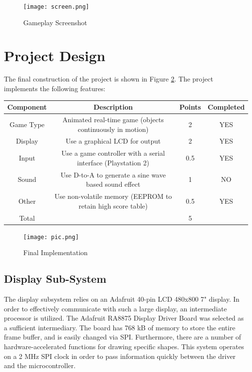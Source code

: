 \documentclass[a4paper, 12pt]{article}
\begin{document}
\begin{figure}[h!]
  \centering
  \texttt{[image: screen.png]}
  \caption{Gameplay Screenshot}
  \label{fig:screen}
\end{figure}

\section*{Project Design}
The final construction of the project is shown in Figure \ref{fig:pic}. The project implements the following features:

\begin{center}
  {\footnotesize
  \begin{tabular}{ |c|c|c|c| }
    \hline
    \textbf{Component} & \textbf{Description} & \textbf{Points} & \textbf{Completed} \\
    \hline
    \hline
    Game Type & Animated real-time game (objects continuously in motion) & 2 & YES\\
    \hline
    Display & Use a graphical LCD for output  & 2 & YES\\
    \hline
    Input & Use a game controller with a serial interface (Playstation 2) & 0.5 & YES\\ 
    \hline
    Sound & Use D-to-A to generate a sine wave based sound effect  & 1 & NO\\
    \hline
    Other & Use non-volatile memory (EEPROM  to retain high score table) & 0.5 & YES\\ 
    \hline
    Total & & 5 & \\ 
    \hline
  \end{tabular}
  }
\end{center}

\begin{figure}[h!]
  \centering
  \texttt{[image: pic.png]}
  \caption{Final Implementation}
  \label{fig:pic}
\end{figure}

\subsection*{Display Sub-System}
The display subsystem relies on an Adafruit 40-pin LCD 480x800 7" display. In order to effectively communicate with such a large display, an intermediate processor is utilized. The Adafruit RA8875 Display Driver Board was selected as a sufficient intermediary. The board has 768 kB of memory to store the entire frame buffer, and is easily changed via SPI. Furthermore, there are a number of hardware-accelerated functions for drawing specific shapes. This system operates on a 2 MHz SPI clock in order to pass information quickly between the driver and the microcontroller.  
\end{document}
